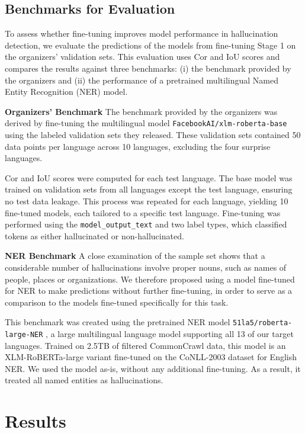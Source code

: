 \documentclass[11pt]{article}
\begin{document}
\subsection{Benchmarks for Evaluation}
To assess whether fine-tuning improves model performance in hallucination detection, we evaluate the predictions of the models from fine-tuning Stage 1 on the organizers' validation sets. This evaluation uses Cor and IoU scores and compares the results against three benchmarks: (i) the benchmark provided by the organizers and (ii) the performance of a pretrained multilingual Named Entity Recognition (NER) model. 

\textbf{Organizers' Benchmark}
The benchmark provided by the organizers was derived by fine-tuning the multilingual model \texttt{FacebookAI/xlm-roberta-base} \cite{DBLP:journals/corr/abs-1911-02116} using the labeled validation sets they released. These validation sets contained 50 data points per language across 10 languages, excluding the four surprise languages.

Cor and IoU scores were computed for each test language. The base model was trained on validation sets from all languages except the test language, ensuring no test data leakage. This process was repeated for each language, yielding 10 fine-tuned models, each tailored to a specific test language. Fine-tuning was performed using the \texttt{model\_output\_text} and two label types, which classified tokens as either hallucinated or non-hallucinated.



\textbf{NER Benchmark}
A close examination of the sample set shows that a considerable number of hallucinations involve proper nouns, such as names of people, places or organizations. We therefore proposed using a model fine-tuned for NER to make predictions without further fine-tuning, in order to serve as a comparison to the models fine-tuned specifically for this task.

This benchmark was created using the pretrained NER model \texttt{51la5/roberta-large-NER} \cite{conneau2019unsupervised}, a large multilingual language model supporting all 13 of our target languages. Trained on 2.5TB of filtered CommonCrawl data, this model is an XLM-RoBERTa-large variant fine-tuned on the CoNLL-2003 dataset for English NER. We used the model as-is, without any additional fine-tuning. As a result, it treated all named entities as hallucinations.

\section{Results}
\end{document}
